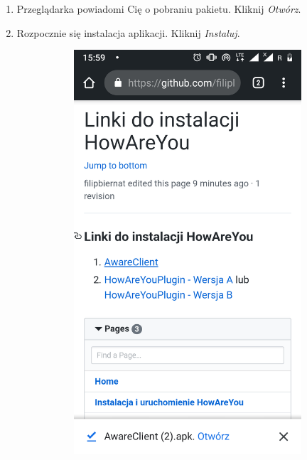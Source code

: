 \begin{enumerate}
	\item Przeglądarka powiadomi Cię o pobraniu pakietu. Kliknij \textit{Otwórz}. 
	
	\item Rozpocznie się instalacja aplikacji. Kliknij \textit{Instaluj}.
	
	\begin{figure}[H]
		\centering
		\begin{subfigure}{0.35\textwidth}
			\centering
			\includegraphics[scale=0.14]{dodatekA/2_3.png}

\end{subfigure}
\end{figure}
\end{enumerate}
